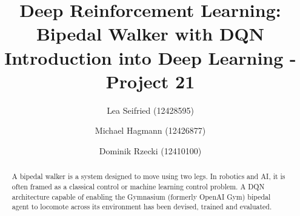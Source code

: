 \begin{frontmatter}
\vfill

\title{%
Deep Reinforcement Learning: Bipedal Walker with DQN\\
\small Introduction into Deep Learning - Project 21
}

\author{Lea Seifried (12428595)}
\author{Michael Hagmann (12426877)}
\author{Dominik Rzecki (12410100)}

\renewcommand*{\today}{\MonthYearDateFormat\displaydate{dateName}} 


\begin{abstract}

A bipedal walker is a system designed to move using two legs. In robotics and AI, it is often framed as a classical control or machine learning control problem. A DQN architecture capable of enabling the Gymnasium (formerly OpenAI Gym) bipedal agent to locomote across its environment has been devised, trained and evaluated.

\end{abstract}
\end{frontmatter}
